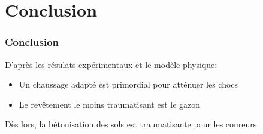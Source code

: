 \section{Conclusion}
\begin{frame}
    \frametitle{Conclusion}
    D'après les résulats expérimentaux et le modèle physique:
    \begin{itemize}
        \item Un chaussage adapté est primordial pour atténuer les chocs
        \item Le revêtement le moins traumatisant est le gazon
    \end{itemize}
    Dès lors, la bétonisation des sols est traumatisante pour les coureurs.
\end{frame}
